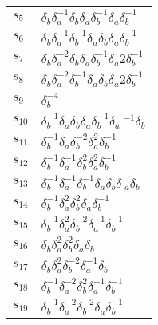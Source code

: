 \documentclass{article}
\begin{document}
\begin{center}
\begin{tabular}{ll}
$s_{5}$ & $\delta_b^{}\delta_a^{-1}\delta_b^{}\delta_a^{}\delta_b^{-1}\delta_a^\
{}\delta_b^{-1}$ \\
$s_{6}$ & $\delta_b^{}\delta_a^{-1}\delta_b^{-1}\delta_a^{}\delta_b^{}\delta_a^\
{}\delta_b^{-1}$ \\
$s_{7}$ & $\delta_b^{}\delta_a^{-2}\delta_b^{}\delta_a^{}\delta_b^{-1}\delta_a^\
{2}\delta_b^{-1}$ \\
$s_{8}$ & $\delta_b^{}\delta_a^{-2}\delta_b^{-1}\delta_a^{}\delta_b^{}\delta_a^\
{2}\delta_b^{-1}$ \\
$s_{9}$ & $\delta_b^{-4}$ \\
$s_{10}$ & $\delta_b^{-1}\delta_a^{}\delta_b^{}\delta_a^{}\delta_b^{-1}\delta_a\
^{-1}\delta_b^{}$ \\
$s_{11}$ & $\delta_b^{-1}\delta_a^{}\delta_b^{-2}\delta_a^{2}\delta_b^{-1}$ \\
$s_{12}$ & $\delta_b^{-1}\delta_a^{-1}\delta_b^{2}\delta_a^{2}\delta_b^{-1}$ \\
$s_{13}$ & $\delta_b^{-1}\delta_a^{-1}\delta_b^{-1}\delta_a^{}\delta_b^{}\delta\
_a^{}\delta_b^{}$ \\
$s_{14}$ & $\delta_b^{-1}\delta_a^{2}\delta_b^{2}\delta_a^{}\delta_b^{-1}$ \\
$s_{15}$ & $\delta_b^{-1}\delta_a^{2}\delta_b^{-2}\delta_a^{-1}\delta_b^{-1}$ \\
$s_{16}$ & $\delta_b^{}\delta_a^{2}\delta_b^{2}\delta_a^{}\delta_b^{}$ \\
$s_{17}$ & $\delta_b^{}\delta_a^{2}\delta_b^{-2}\delta_a^{-1}\delta_b^{}$ \\
$s_{18}$ & $\delta_b^{-1}\delta_a^{-2}\delta_b^{2}\delta_a^{-1}\delta_b^{-1}$ \\
$s_{19}$ & $\delta_b^{-1}\delta_a^{-2}\delta_b^{-2}\delta_a^{}\delta_b^{-1}$ \\
\bottomrule
\end{tabular}
\end{center}

\thispagestyle{empty}
\end{document}
